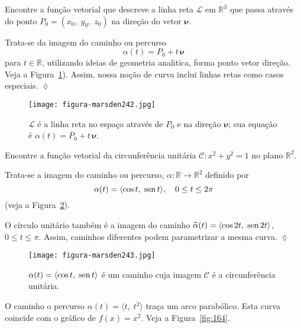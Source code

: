 \begin{exc}\label{exem:1-01}
Encontre a função vetorial que descreve 
a linha reta \(\mathcal{L}\) em \(\mathbb{R}^{3}\)  que passa
através do ponto \(P_{0}=(x_{0},\; y_{0},\; z_{0})\) na direção do vetor \(\boldsymbol{\nu}\).
\end{exc}

\solo Trata-se da  imagem do caminho ou percurso
\begin{equation*}
  \alpha(t)=P_{0}+t\,\boldsymbol{\nu}
\end{equation*}
para \(t \in \mathbb{R}\), utilizando ideias de geometria analitica, forma ponto vetor direção. Veja a Figura~\ref{fig:162}). Assim, nossa noção de curva inclui linhas retas como casos especiais. \hfill \(\lozenge\)

\begin{figure}[H]
  \centering
  \texttt{[image: figura-marsden242.jpg]}
  \caption{\(\mathcal{L}\) é a linha reta no espaço através de \(P_{0}\) e na direção \(\boldsymbol{\nu}\); sua equação é
  \(\alpha(t) = P_{0} + t\,\boldsymbol{\nu}.\)}\label{fig:162}
\end{figure}

\begin{exc}\label{exe:1-02}
Encontre a função vetorial da circunferência unitária \(\mathcal{C} \colon x^{2}+y^{2}=1\) no plano \(\mathbb{R}^{2}\).
\end{exc}

\solo
Trata-se a imagem do caminho ou percurso, \(\alpha \colon \mathbb{R} \to \mathbb{R}^{2}\) definido por
\begin{equation*}
\alpha(t) =\langle \cos t, \; \operatorname{sen} t \rangle, \quad 0 \leq t \leq 2\pi
\end{equation*}
(veja a Figura~\ref{fig:243}).

O círculo unitário também é a imagem do caminho \(\widetilde{\alpha}(t) =
\langle \cos 2t,\; \operatorname{sen} 2t\rangle \), \(0 \leq t \leq \pi\). Assim, caminhos diferentes podem parametrizar a mesma curva.
\hfill \(\lozenge\)
\begin{figure}[H]
  \centering
  \texttt{[image: figura-marsden243.jpg]}
  \caption{\(\alpha(t) = \langle\cos t,\; \operatorname{sen} t\rangle\) é um caminho cuja imagem \(\mathcal{C}\) é a circunferência unitária.}\label{fig:243}
\end{figure}


\begin{exc}\label{exe:1-03}
O caminho o percurso \( \alpha(t) =\langle t,\; t^{2}\rangle\) traça um arco parabólico. Esta curva coincide com o gráfico de \(f(x) = x^{2}\). Veja a Figura~\ref{fig:164}.
\end{exc}

